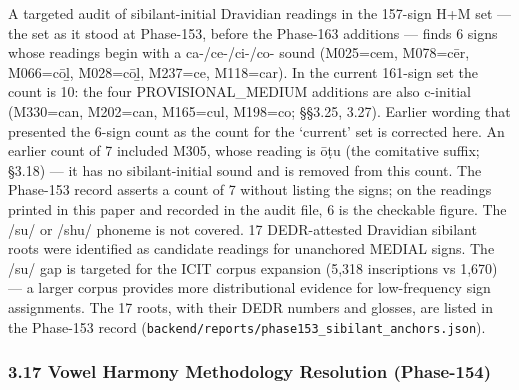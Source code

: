 \documentclass[
]{article}
\begin{document}
A targeted audit of sibilant-initial Dravidian readings in the 157-sign H+M set --- the set as it stood at Phase-153, before the Phase-163 additions --- finds 6 signs whose readings begin with a ca-/ce-/ci-/co- sound (M025=cem, M078=cēr, M066=cōḻ, M028=cōḻ, M237=ce, M118=car). In the current 161-sign set the count is 10: the four PROVISIONAL\_MEDIUM additions are also c-initial (M330=can, M202=can, M165=cul, M198=co; §§3.25, 3.27). Earlier wording that presented the 6-sign count as the count for the `current' set is corrected here. An earlier count of 7 included M305, whose reading is ōṭu (the comitative suffix; §3.18) --- it has no sibilant-initial sound and is removed from this count. The Phase-153 record asserts a count of 7 without listing the signs; on the readings printed in this paper and recorded in the audit file, 6 is the checkable figure. The /su/ or
/shu/ phoneme is not covered. 17 DEDR-attested Dravidian sibilant roots
were identified as candidate readings for unanchored MEDIAL signs. The
/su/ gap is targeted for the ICIT corpus expansion (5,318 inscriptions
vs 1,670) --- a larger corpus provides more distributional evidence for low-frequency sign assignments. The 17 roots, with their DEDR numbers and glosses, are listed in the Phase-153 record (\texttt{backend/reports/phase153\_sibilant\_anchors.json}).

\subsubsection{3.17 Vowel Harmony Methodology Resolution
(Phase-154)}\label{vowel-harmony-methodology-resolution-phase-154}
\end{document}
